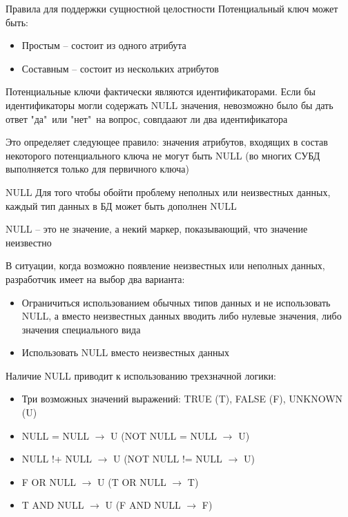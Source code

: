 \documentclass[12pt]{article}
\begin{document}
\begin{nota}{Правила для поддержки сущностной целостности}
    Потенциальный ключ может быть:

    \begin{itemize}
        \item Простым -- состоит из одного атрибута 
        \item Составным -- состоит из нескольких атрибутов 
    \end{itemize}

    Потенциальные ключи фактически являются идентификаторами. Если бы идентификаторы могли содержать NULL значения, невозможно было бы дать ответ "да"\ или "нет"\ на вопрос, совпдаают ли два идентификатора 

    Это определяет следующее правило: значения атрибутов, входящих в состав некоторого потенциального ключа не могут быть NULL (во многих СУБД выполняется только для первичного ключа)
\end{nota}

\begin{defin}{NULL}
    Для того чтобы обойти проблему неполных или неизвестных данных, каждый тип данных в БД может быть дополнен NULL

    NULL -- это не значение, а некий маркер, показывающий, что значение неизвестно 

    В ситуации, когда возможно появление неизвестных или неполных данных, разработчик имеет на выбор два варианта: 

    \begin{itemize}
        \item Ограничиться использованием обычных типов данных и не использовать NULL, а вместо неизвестных данных вводить либо нулевые значения, либо значения специального вида 
        \item Использовать NULL вместо неизвестных данных 
    \end{itemize}

    Наличие NULL приводит к использованию трехзначной логики:

    \begin{itemize}
        \item Три возможных значений выражений: TRUE (T), FALSE (F), UNKNOWN (U)
        \item NULL = NULL $\to$ U (NOT NULL = NULL $\to$ U)
        \item NULL !+ NULL $\to$ U (NOT NULL != NULL $\to$ U)
        \item F OR NULL $\to$ U (T OR NULL $\to$ T)
        \item T AND NULL $\to$ U (F AND NULL $\to$ F)
    \end{itemize}
\end{defin}
\end{document}
